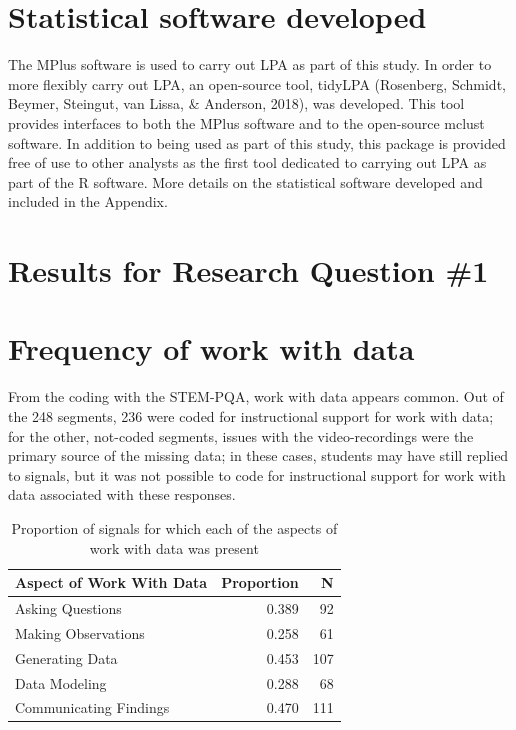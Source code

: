 \documentclass[]{book}
\theoremstyle{definition}
\theoremstyle{definition}
\theoremstyle{definition}
\theoremstyle{remark}
\begin{document}
\section{Statistical software
developed}\label{statistical-software-developed}

The MPlus software is used to carry out LPA as part of this study. In
order to more flexibly carry out LPA, an open-source tool, tidyLPA
(Rosenberg, Schmidt, Beymer, Steingut, van Lissa, \& Anderson, 2018),
was developed. This tool provides interfaces to both the MPlus software
and to the open-source mclust software. In addition to being used as
part of this study, this package is provided free of use to other
analysts as the first tool dedicated to carrying out LPA as part of the
R software. More details on the statistical software developed and
included in the Appendix.

\section{Results for Research Question
\#1}\label{results-for-research-question-1}

\section{Frequency of work with data}\label{frequency-of-work-with-data}

From the coding with the STEM-PQA, work with data appears common. Out of
the 248 segments, 236 were coded for instructional support for work with
data; for the other, not-coded segments, issues with the
video-recordings were the primary source of the missing data; in these
cases, students may have still replied to signals, but it was not
possible to code for instructional support for work with data associated
with these responses.

\begin{table}

\caption{\label{tab:unnamed-chunk-11}Proportion of signals for which each of the aspects of work with data was present}
\centering
\begin{tabular}[t]{lrr}
\toprule
Aspect of Work With Data & Proportion & N\\
\midrule
Asking Questions & 0.389 & 92\\
Making Observations & 0.258 & 61\\
Generating Data & 0.453 & 107\\
Data Modeling & 0.288 & 68\\
Communicating Findings & 0.470 & 111\\
\bottomrule
\end{tabular}
\end{table}
\end{document}
